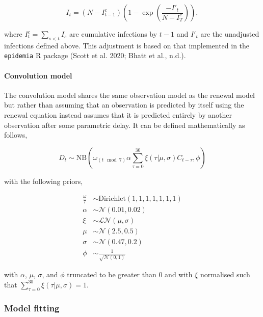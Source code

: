 \begin{equation}
    I_t = (N - I^c_{t-1}) \left(1 - \exp \left(\frac{-I'_t}{N - I^c_{T}}\right)\right),
\end{equation}

where \(I^c_t = \sum_{s< t} I_s\) are cumulative infections by \(t-1\) and \(I'_t\) are the unadjusted infections defined above. This adjustment is based on that implemented in the \texttt{epidemia} R package (Scott et al. 2020; Bhatt et al., n.d.).

\hypertarget{convolution-model}{%
\paragraph{Convolution model}\label{convolution-model}}

The convolution model shares the same observation model as the renewal model but rather than assuming that an observation is predicted by itself using the renewal equation instead assumes that it is predicted entirely by another observation after some parametric delay. It can be defined mathematically as follows,

\begin{equation} 
    D_{t} \sim \mathrm{NB}\left(\omega_{(t \mod 7)} \alpha \sum_{\tau = 0}^{30} \xi(\tau | \mu, \sigma) C_{t-\tau},  \phi \right)
\end{equation}

with the following priors,

\begin{align}
    \frac{\omega}{7} &\sim \mathrm{Dirichlet}(1, 1, 1, 1, 1, 1, 1) \\
    \alpha &\sim \mathcal{N}(0.01, 0.02) \\
    \xi &\sim \mathcal{LN}(\mu, \sigma) \\
    \mu &\sim \mathcal{N}(2.5, 0.5) \\
\sigma &\sim \mathcal{N}(0.47, 0.2) \\
\phi &\sim \frac{1}{\sqrt{\mathcal{N}(0, 1)}}
\end{align}

with \(\alpha\), \(\mu\), \(\sigma\), and \(\phi\) truncated to be greater than 0 and with \(\xi\) normalised such that \(\sum_{\tau = 0}^{30} \xi(\tau | \mu, \sigma) = 1\).

\hypertarget{model-fitting}{%
\subsubsection{Model fitting}\label{model-fitting}}

